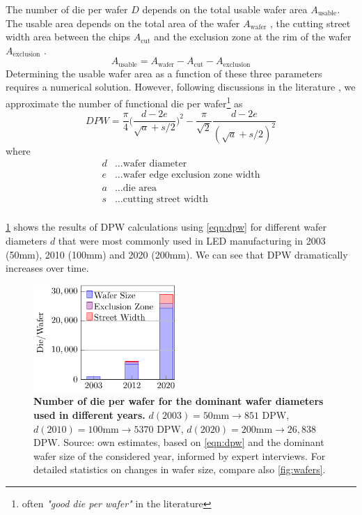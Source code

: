 \documentclass[parskip=full]{article}
\begin{document}
%
The number of die per wafer $D$ depends on the total usable wafer area $A_{\text{usable}}$. The usable area depends on the total area of the wafer $A_{\text{wafer}}$ , the cutting street width area between the chips $A_{\text{cut}}$  and the exclusion zone at the rim of the wafer $A_{\text{exclusion}}$ .
%
\begin{equation}
	A_{\text{usable}}=A_{\text{wafer}}-A_{\text{cut}}-A_{\text{exclusion}}
\end{equation}
%
Determining the usable wafer area as a function of these three parameters requires a numerical solution. However, following discussions in the literature \cite{de2005investigation}, we approximate the number of functional die per wafer\footnote{often \textit{"good die per wafer"} in the literature} as
%
\begin{equation}
\label{eqn:dpw}
	DPW = \frac{\pi}{4}  \bigg ( \frac{d-2e}{\sqrt{a}+s/2} \bigg ) ^2 - \frac{\pi}{\sqrt{2}}\frac{d-2e}{(\sqrt{a}+s/2)^2}
\end{equation}
%
where
%
\begin{align*}
    d &\dots \text{wafer diameter} \\
    e &\dots \text{wafer edge exclusion zone width} \\
    a &\dots \text{die area} \\
    s &\dots \text{cutting street width} \\
\end{align*}

\cref{fig:dpw} shows the results of DPW calculations using \cref{eqn:dpw} for different wafer diameters $d$ that were most commonly used in LED manufacturing in 2003 (50mm), 2010 (100mm) and 2020 (200mm). We can see that DPW dramatically increases over time.

\begin{figure}[h!]
    \centering
    \includegraphics[width=5.5cm]{./figures/die-per-wafer.pdf}
    \caption{\textbf{Number of die per wafer for the dominant wafer diameters used in different years.} $d(2003)=50$mm$\rightarrow851$ DPW, $d(2010)=100$mm$\rightarrow5370$ DPW, $d(2020)=200$mm$\rightarrow26,838$ DPW. Source: own estimates, based on \cref{eqn:dpw} and the dominant wafer size of the considered year, informed by expert interviews. For detailed statistics on changes in wafer size, compare also \cref{fig:wafers}.}
    \label{fig:dpw}
\end{figure}
\end{document}
